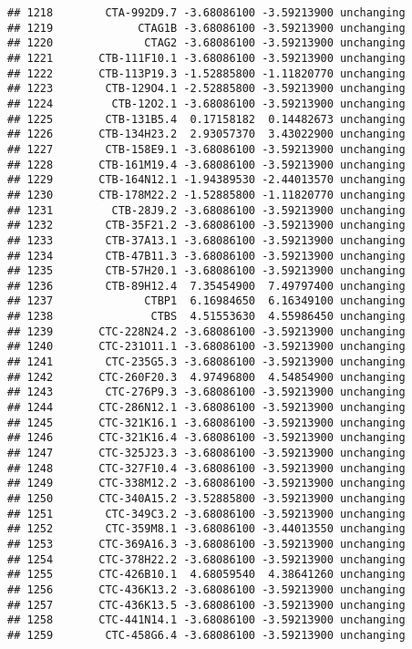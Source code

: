 \documentclass[]{article}
\begin{document}
\begin{verbatim}
## 1218        CTA-992D9.7 -3.68086100 -3.59213900 unchanging
## 1219             CTAG1B -3.68086100 -3.59213900 unchanging
## 1220              CTAG2 -3.68086100 -3.59213900 unchanging
## 1221       CTB-111F10.1 -3.68086100 -3.59213900 unchanging
## 1222       CTB-113P19.3 -1.52885800 -1.11820770 unchanging
## 1223        CTB-129O4.1 -2.52885800 -3.59213900 unchanging
## 1224         CTB-12O2.1 -3.68086100 -3.59213900 unchanging
## 1225        CTB-131B5.4  0.17158182  0.14482673 unchanging
## 1226       CTB-134H23.2  2.93057370  3.43022900 unchanging
## 1227        CTB-158E9.1 -3.68086100 -3.59213900 unchanging
## 1228       CTB-161M19.4 -3.68086100 -3.59213900 unchanging
## 1229       CTB-164N12.1 -1.94389530 -2.44013570 unchanging
## 1230       CTB-178M22.2 -1.52885800 -1.11820770 unchanging
## 1231         CTB-28J9.2 -3.68086100 -3.59213900 unchanging
## 1232        CTB-35F21.2 -3.68086100 -3.59213900 unchanging
## 1233        CTB-37A13.1 -3.68086100 -3.59213900 unchanging
## 1234        CTB-47B11.3 -3.68086100 -3.59213900 unchanging
## 1235        CTB-57H20.1 -3.68086100 -3.59213900 unchanging
## 1236        CTB-89H12.4  7.35454900  7.49797400 unchanging
## 1237              CTBP1  6.16984650  6.16349100 unchanging
## 1238               CTBS  4.51553630  4.55986450 unchanging
## 1239       CTC-228N24.2 -3.68086100 -3.59213900 unchanging
## 1240       CTC-231O11.1 -3.68086100 -3.59213900 unchanging
## 1241        CTC-235G5.3 -3.68086100 -3.59213900 unchanging
## 1242       CTC-260F20.3  4.97496800  4.54854900 unchanging
## 1243        CTC-276P9.3 -3.68086100 -3.59213900 unchanging
## 1244       CTC-286N12.1 -3.68086100 -3.59213900 unchanging
## 1245       CTC-321K16.1 -3.68086100 -3.59213900 unchanging
## 1246       CTC-321K16.4 -3.68086100 -3.59213900 unchanging
## 1247       CTC-325J23.3 -3.68086100 -3.59213900 unchanging
## 1248       CTC-327F10.4 -3.68086100 -3.59213900 unchanging
## 1249       CTC-338M12.2 -3.68086100 -3.59213900 unchanging
## 1250       CTC-340A15.2 -3.52885800 -3.59213900 unchanging
## 1251        CTC-349C3.2 -3.68086100 -3.59213900 unchanging
## 1252        CTC-359M8.1 -3.68086100 -3.44013550 unchanging
## 1253       CTC-369A16.3 -3.68086100 -3.59213900 unchanging
## 1254       CTC-378H22.2 -3.68086100 -3.59213900 unchanging
## 1255       CTC-426B10.1  4.68059540  4.38641260 unchanging
## 1256       CTC-436K13.2 -3.68086100 -3.59213900 unchanging
## 1257       CTC-436K13.5 -3.68086100 -3.59213900 unchanging
## 1258       CTC-441N14.1 -3.68086100 -3.59213900 unchanging
## 1259        CTC-458G6.4 -3.68086100 -3.59213900 unchanging

\end{verbatim}
\end{document}
